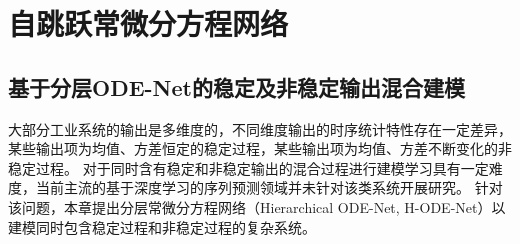 


\section{自跳跃常微分方程网络}
\label{sec:4_ajode}
\subsection{基于分层ODE-Net的稳定及非稳定输出混合建模}
大部分工业系统的输出是多维度的，不同维度输出的时序统计特性存在一定差异，某些输出项为均值、方差恒定的稳定过程，某些输出项为均值、方差不断变化的非稳定过程。
对于同时含有稳定和非稳定输出的混合过程进行建模学习具有一定难度，当前主流的基于深度学习的序列预测领域并未针对该类系统开展研究。
针对该问题，本章提出分层常微分方程网络（Hierarchical ODE-Net, H-ODE-Net）以建模同时包含稳定过程和非稳定过程的复杂系统。

